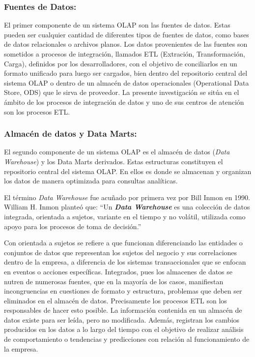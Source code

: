 \subsubsection{Fuentes de Datos:}
El primer componente de un sistema OLAP son las fuentes de datos. Estas pueden ser cualquier cantidad de diferentes 
tipos de fuentes de datos, como bases de datos relacionales o archivos planos. Los datos provenientes de las fuentes 
son sometidos a procesos de integración, llamados ETL (Extraci\'on, Transformaci\'on, Carga), definidos por los desarrolladores, 
con el objetivo de conciliarlos en un formato unificado para luego ser cargados, bien dentro del repositorio central del sistema OLAP o 
dentro de un almacén de datos operacionales
(Operational Data Store, ODS) que le sirva de proveedor. La presente investigación se sitúa en el ámbito de los 
procesos de integración de datos y uno de sus centros de atención son los procesos ETL.

\subsubsection{Almacén de datos y Data Marts:}
El segundo componente de un sistema OLAP es el almacén de datos (\emph{Data Warehouse}) y los Data Marts derivados. 
Estas estructuras constituyen el repositorio central 
del sistema OLAP. En ellos es donde se almacenan y 
organizan los datos de manera optimizada para consultas analíticas. 

El término \emph{Data Warehouse} fue acuñado por primera vez por Bill Inmon en 1990. William H. Inmon planteó que: 
“Un \textbf{\emph{Data Warehouse}} es una colección de datos integrada, orientada a sujetos, variante en el tiempo y 
no volátil, utilizada como apoyo para los procesos de toma de decisión.”

Con orientada a sujetos se refiere a que funcionan diferenciando las entidades o conjuntos de datos que representan 
los sujetos del negocio y sus correlaciones dentro de la empresa, a diferencia de los sistemas transaccionales que 
se enfocan en eventos o acciones específicas. Integrados, pues los almacenes de datos se nutren de numerosas fuentes, 
que en la mayor\'ia de los casos, manifiestan 
incongruencias en cuestiones de formato y estructura, problemas que deben ser eliminados en el 
almac\'en de datos. Precisamente los procesos ETL son los responsables de hacer esto posible. 
La información contenida en un almac\'en de datos existe para ser leída, pero no modificada. Adem\'as, registran 
los cambios producidos en los datos a lo largo del tiempo con el objetivo de realizar análisis de comportamiento 
o tendencias y predicciones con relación al funcionamiento de la empresa.

